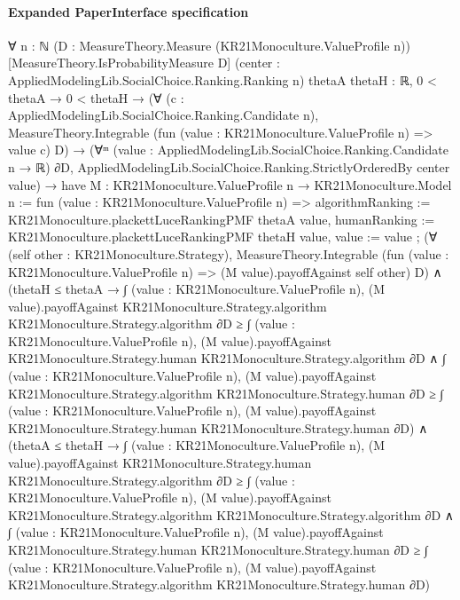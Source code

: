 \documentclass[10pt]{article}
\begin{document}
\paragraph{Expanded PaperInterface specification}
\begin{ReviewVerbatim}
∀ {n : ℕ} (D : MeasureTheory.Measure (KR21Monoculture.ValueProfile n)) [MeasureTheory.IsProbabilityMeasure D]
  (center : AppliedModelingLib.SocialChoice.Ranking.Ranking n) {thetaA thetaH : ℝ},
  0 < thetaA →
    0 < thetaH →
      (∀ (c : AppliedModelingLib.SocialChoice.Ranking.Candidate n),
          MeasureTheory.Integrable (fun (value : KR21Monoculture.ValueProfile n) => value c) D) →
        (∀ᵐ (value : AppliedModelingLib.SocialChoice.Ranking.Candidate n → ℝ) ∂D,
            AppliedModelingLib.SocialChoice.Ranking.StrictlyOrderedBy center value) →
          have M : KR21Monoculture.ValueProfile n → KR21Monoculture.Model n :=
            fun (value : KR21Monoculture.ValueProfile n) =>
            { algorithmRanking := KR21Monoculture.plackettLuceRankingPMF thetaA value,
              humanRanking := KR21Monoculture.plackettLuceRankingPMF thetaH value, value := value };
          (∀ (self other : KR21Monoculture.Strategy),
              MeasureTheory.Integrable
                (fun (value : KR21Monoculture.ValueProfile n) => (M value).payoffAgainst self other) D) ∧
            (thetaH ≤ thetaA →
                ∫ (value : KR21Monoculture.ValueProfile n),
                      (M value).payoffAgainst KR21Monoculture.Strategy.algorithm KR21Monoculture.Strategy.algorithm ∂D ≥
                    ∫ (value : KR21Monoculture.ValueProfile n),
                      (M value).payoffAgainst KR21Monoculture.Strategy.human KR21Monoculture.Strategy.algorithm ∂D ∧
                  ∫ (value : KR21Monoculture.ValueProfile n),
                      (M value).payoffAgainst KR21Monoculture.Strategy.algorithm KR21Monoculture.Strategy.human ∂D ≥
                    ∫ (value : KR21Monoculture.ValueProfile n),
                      (M value).payoffAgainst KR21Monoculture.Strategy.human KR21Monoculture.Strategy.human ∂D) ∧
              (thetaA ≤ thetaH →
                ∫ (value : KR21Monoculture.ValueProfile n),
                      (M value).payoffAgainst KR21Monoculture.Strategy.human KR21Monoculture.Strategy.algorithm ∂D ≥
                    ∫ (value : KR21Monoculture.ValueProfile n),
                      (M value).payoffAgainst KR21Monoculture.Strategy.algorithm KR21Monoculture.Strategy.algorithm ∂D ∧
                  ∫ (value : KR21Monoculture.ValueProfile n),
                      (M value).payoffAgainst KR21Monoculture.Strategy.human KR21Monoculture.Strategy.human ∂D ≥
                    ∫ (value : KR21Monoculture.ValueProfile n),
                      (M value).payoffAgainst KR21Monoculture.Strategy.algorithm KR21Monoculture.Strategy.human ∂D)
\end{ReviewVerbatim}
\end{document}
